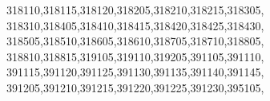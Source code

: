 \documentclass[
  12,
  dvipsnames]{article}
\newenvironment{Shaded}{\begin{snugshade}}{\end{snugshade}}
\newcommand{\NormalTok}[1]{#1}
\newcommand{\StringTok}[1]{\textcolor[rgb]{0.31,0.60,0.02}{#1}}
\begin{document}
\begin{Shaded}
\begin{Highlighting}[]
                  \StringTok{\textquotesingle{}318110\textquotesingle{}}\NormalTok{,}\StringTok{\textquotesingle{}318115\textquotesingle{}}\NormalTok{,}\StringTok{\textquotesingle{}318120\textquotesingle{}}\NormalTok{,}\StringTok{\textquotesingle{}318205\textquotesingle{}}\NormalTok{,}\StringTok{\textquotesingle{}318210\textquotesingle{}}\NormalTok{,}\StringTok{\textquotesingle{}318215\textquotesingle{}}\NormalTok{,}\StringTok{\textquotesingle{}318305\textquotesingle{}}\NormalTok{,}
                  \StringTok{\textquotesingle{}318310\textquotesingle{}}\NormalTok{,}\StringTok{\textquotesingle{}318405\textquotesingle{}}\NormalTok{,}\StringTok{\textquotesingle{}318410\textquotesingle{}}\NormalTok{,}\StringTok{\textquotesingle{}318415\textquotesingle{}}\NormalTok{,}\StringTok{\textquotesingle{}318420\textquotesingle{}}\NormalTok{,}\StringTok{\textquotesingle{}318425\textquotesingle{}}\NormalTok{,}\StringTok{\textquotesingle{}318430\textquotesingle{}}\NormalTok{,}
                  \StringTok{\textquotesingle{}318505\textquotesingle{}}\NormalTok{,}\StringTok{\textquotesingle{}318510\textquotesingle{}}\NormalTok{,}\StringTok{\textquotesingle{}318605\textquotesingle{}}\NormalTok{,}\StringTok{\textquotesingle{}318610\textquotesingle{}}\NormalTok{,}\StringTok{\textquotesingle{}318705\textquotesingle{}}\NormalTok{,}\StringTok{\textquotesingle{}318710\textquotesingle{}}\NormalTok{,}\StringTok{\textquotesingle{}318805\textquotesingle{}}\NormalTok{,}
                  \StringTok{\textquotesingle{}318810\textquotesingle{}}\NormalTok{,}\StringTok{\textquotesingle{}318815\textquotesingle{}}\NormalTok{,}\StringTok{\textquotesingle{}319105\textquotesingle{}}\NormalTok{,}\StringTok{\textquotesingle{}319110\textquotesingle{}}\NormalTok{,}\StringTok{\textquotesingle{}319205\textquotesingle{}}\NormalTok{,}\StringTok{\textquotesingle{}391105\textquotesingle{}}\NormalTok{,}\StringTok{\textquotesingle{}391110\textquotesingle{}}\NormalTok{,}
                  \StringTok{\textquotesingle{}391115\textquotesingle{}}\NormalTok{,}\StringTok{\textquotesingle{}391120\textquotesingle{}}\NormalTok{,}\StringTok{\textquotesingle{}391125\textquotesingle{}}\NormalTok{,}\StringTok{\textquotesingle{}391130\textquotesingle{}}\NormalTok{,}\StringTok{\textquotesingle{}391135\textquotesingle{}}\NormalTok{,}\StringTok{\textquotesingle{}391140\textquotesingle{}}\NormalTok{,}\StringTok{\textquotesingle{}391145\textquotesingle{}}\NormalTok{,}
                  \StringTok{\textquotesingle{}391205\textquotesingle{}}\NormalTok{,}\StringTok{\textquotesingle{}391210\textquotesingle{}}\NormalTok{,}\StringTok{\textquotesingle{}391215\textquotesingle{}}\NormalTok{,}\StringTok{\textquotesingle{}391220\textquotesingle{}}\NormalTok{,}\StringTok{\textquotesingle{}391225\textquotesingle{}}\NormalTok{,}\StringTok{\textquotesingle{}391230\textquotesingle{}}\NormalTok{,}\StringTok{\textquotesingle{}395105\textquotesingle{}}\NormalTok{,}

\end{Highlighting}
\end{Shaded}
\end{document}
